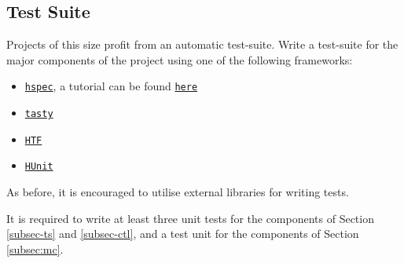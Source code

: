 \documentclass{article}
\begin{document}
\subsection{Test Suite}
\label{subsec-testsuite}
Projects of this size profit from an automatic test-suite. 
Write a test-suite for the major components of the project using one of the following frameworks:

\begin{itemize}
\item \href{https://hackage.haskell.org/package/hspec}{\texttt{hspec}}, a tutorial can be found \href{https://hspec.github.io/}{\texttt{here}}
\item \href{https://hackage.haskell.org/package/tasty}{\texttt{tasty}}
\item \href{https://hackage.haskell.org/package/HTF}{\texttt{HTF}}
\item \href{https://hackage.haskell.org/package/HUnit}{\texttt{HUnit}}
\end{itemize}

As before, it is encouraged to utilise external libraries for writing tests.

It is required to write at least three unit tests for the components of
Section \ref{subsec-ts} and \ref{subsec-ctl}, and a test unit for the
components of Section \ref{subsec:mc}.
\end{document}
